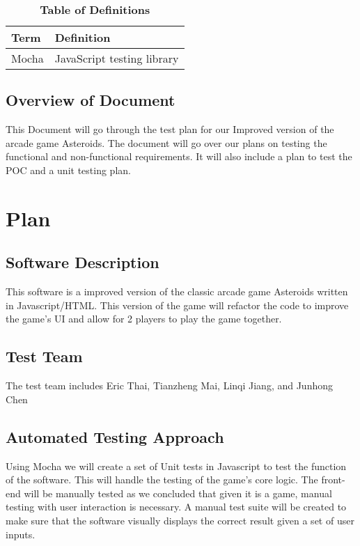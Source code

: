 \documentclass[12pt, titlepage]{article}
\begin{document}
\begin{table}[!htbp]
\caption{\textbf{Table of Definitions}} \label{Table}

\begin{tabularx}{\textwidth}{p{3cm}X}
\toprule
\textbf{Term} & \textbf{Definition}\\
\midrule
Mocha & JavaScript testing library\\

\bottomrule
\end{tabularx}

\end{table}	

\subsection{Overview of Document}
This Document will go through the test plan for our Improved version of the arcade game Asteroids. The document will go over our plans on testing the functional and non-functional requirements. It will also include a plan to test the POC and a unit testing plan.

\section{Plan}
	
\subsection{Software Description}
This software is a improved version of the classic arcade game Asteroids written in Javascript/HTML. This version of the game will refactor the code to improve the game's UI and allow for 2 players to play the game together.

\subsection{Test Team}
The test team includes Eric Thai,  Tianzheng Mai, Linqi Jiang, and Junhong Chen
\subsection{Automated Testing Approach}
Using Mocha we will create a set of Unit tests in Javascript to test the function of the software. This will handle the testing of the game's core logic. The front-end will be manually tested as we concluded that given it is a game, manual testing with user interaction is necessary. A manual test suite will be created to make sure that the software visually displays the correct result given a set of user inputs.
\end{document}
